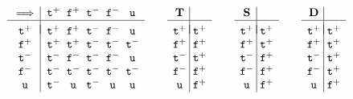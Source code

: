 \documentclass{\filespath jancl}
\newcommand{\twts}{{{\tt t}^+}}
\newcommand{\twfs}{{{\tt f}^+}}
\newcommand{\twti}{{{\tt t}^-}}
\newcommand{\twfi}{{{\tt f}^-}}
\newcommand{\twu}{{\tt u}}
\def\tf{{\bf D}}
\def\holds{{\bf T}}
\def\deft{{\bf S}}
\begin{document}
\begin{definition}
\[\begin{array}{c@{\;}|@{\;\;}c@{\;\;}c@{\;\;}c@{\;\;}c@{\;\;}c}
\implies & \twts & \twfs & \twti & \twfi & \twu\\ \hline\\[-1.9ex]
\twts    & \twts & \twfs & \twti & \twfi & \twu\\
\twfs    & \twts & \twts & \twti & \twti & \twti\\
\twti    & \twti & \twfi & \twti & \twfi & \twu\\
\twfi    & \twti & \twti & \twti & \twti & \twti\\
\twu     & \twti & \twu  & \twti & \twu  & \twu
\end{array}\qquad
\begin{array}{c@{\;}|@{\;}c}
\holds & \\ \hline\\[-1.9ex]
\twts & \twts   \\
\twfs & \twfs  \\
\twti & \twts \\
\twfi & \twfs \\
\twu  & \twfs \\
\end{array}\qquad
\begin{array}{c@{\;}|@{\;}c}
\deft & \\ \hline\\[-1.9ex]
\twts  & \twts \\
\twfs  & \twts \\
\twti  & \twfs \\
\twfi  & \twfs \\
\twu   & \twfs 
\end{array}\qquad
\begin{array}{c@{\;}|@{\;}c}
\tf    & \\ \hline\\[-1.9ex]
\twts  & \twts \\
\twfs  & \twts \\
\twti  & \twts \\
\twfi  & \twts \\
\twu   & \twfs 
\end{array}\]\\[1ex]
\end{definition}
\end{document}
